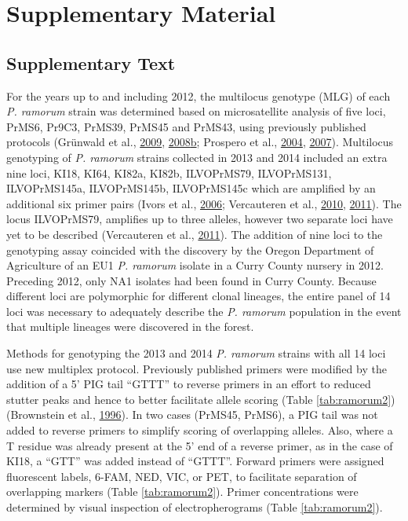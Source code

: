 \documentclass[double,11pt]{beavtex}
\begin{document}
  \section{Supplementary Material}\label{supplementary-material}
  
  \subsection{Supplementary Text}\label{text:S1}
  
  For the years up to and including 2012, the multilocus genotype (MLG) of
  each \emph{P. ramorum} strain was determined based on microsatellite
  analysis of five loci, PrMS6, Pr9C3, PrMS39, PrMS45 and PrMS43, using
  previously published protocols (Grünwald et al.,
  \protect\hyperlink{ref-grunwald2009standardizing}{2009},
  \protect\hyperlink{ref-grunwald2008susceptibility}{2008}\protect\hyperlink{ref-grunwald2008susceptibility}{b};
  Prospero et al., \protect\hyperlink{ref-prospero2004isolation}{2004},
  \protect\hyperlink{ref-prospero2007population}{2007}). Multilocus
  genotyping of \emph{P. ramorum} strains collected in 2013 and 2014
  included an extra nine loci, KI18, KI64, KI82a, KI82b, ILVOPrMS79,
  ILVOPrMS131, ILVOPrMS145a, ILVOPrMS145b, ILVOPrMS145c which are
  amplified by an additional six primer pairs (Ivors et al.,
  \protect\hyperlink{ref-ivors2006microsatellite}{2006}; Vercauteren et
  al., \protect\hyperlink{ref-vercauteren2010clonal}{2010},
  \protect\hyperlink{ref-vercauteren2011identification}{2011}). The locus
  ILVOPrMS79, amplifies up to three alleles, however two separate loci
  have yet to be described (Vercauteren et al.,
  \protect\hyperlink{ref-vercauteren2011identification}{2011}). The
  addition of nine loci to the genotyping assay coincided with the
  discovery by the Oregon Department of Agriculture of an EU1 \emph{P.
  ramorum} isolate in a Curry County nursery in 2012. Preceding 2012, only
  NA1 isolates had been found in Curry County. Because different loci are
  polymorphic for different clonal lineages, the entire panel of 14 loci
  was necessary to adequately describe the \emph{P. ramorum} population in
  the event that multiple lineages were discovered in the forest.
  
  Methods for genotyping the 2013 and 2014 \emph{P. ramorum} strains with
  all 14 loci use new multiplex protocol. Previously published primers
  were modified by the addition of a 5' PIG tail ``GTTT'' to reverse
  primers in an effort to reduced stutter peaks and hence to better
  facilitate allele scoring (Table \ref{tab:ramorum2}) (Brownstein et al.,
  \protect\hyperlink{ref-brownstein1996modulation}{1996}). In two cases
  (PrMS45, PrMS6), a PIG tail was not added to reverse primers to simplify
  scoring of overlapping alleles. Also, where a T residue was already
  present at the 5' end of a reverse primer, as in the case of KI18, a
  ``GTT'' was added instead of ``GTTT''. Forward primers were assigned
  fluorescent labels, 6-FAM, NED, VIC, or PET, to facilitate separation of
  overlapping markers (Table \ref{tab:ramorum2}). Primer concentrations
  were determined by visual inspection of electropherograms (Table
  \ref{tab:ramorum2}).
  
\end{document}
